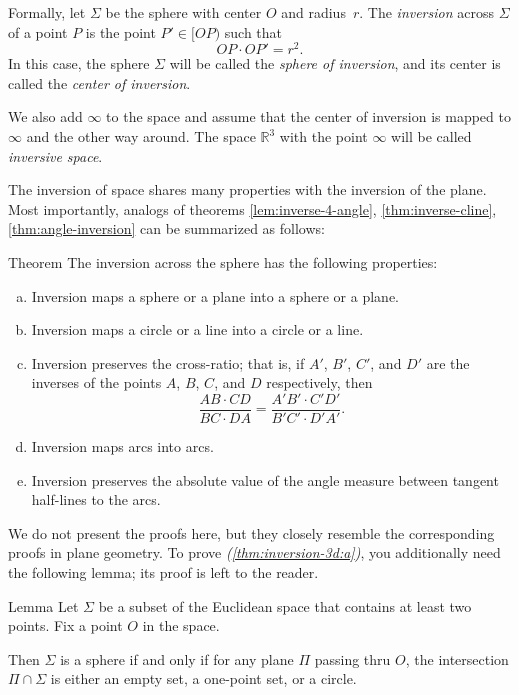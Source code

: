 Formally, let $\Sigma$ be the sphere with center $O$ and radius~$r$.
The \emph{inversion} across $\Sigma$ of a point $P$ is the point $P'\in[OP)$ such that
$$OP\cdot OP'=r^2.$$
In this case, the sphere $\Sigma$  will be called the 
\emph{sphere of inversion},
and its center is called the \emph{center of inversion}.

We also add $\infty$ to the space and assume that the center of inversion is mapped to $\infty$ and the other way around. 
The space $\mathbb{R}^3$ with the point $\infty$ will be called \emph{inversive space}.

The inversion of space shares many properties with the inversion of the plane.
Most importantly, analogs of theorems \ref{lem:inverse-4-angle}, \ref{thm:inverse-cline}, \ref{thm:angle-inversion} can be summarized as follows:

\begin{thm}{Theorem}\label{thm:inversion-3d}
The inversion across the sphere has the following properties:
\begin{enumerate}[(a)]
\item\label{thm:inversion-3d:a} Inversion maps a sphere or a plane into a sphere or a plane.
\item\label{thm:inversion-3d:b} Inversion maps a circle or a line into a circle or a line. 
\item\label{thm:inversion-3d:cross-ratio} Inversion preserves the cross-ratio;
that is, if $A'$, $B'$, $C'$, and $D'$ are the inverses of the points $A$, $B$, $C$, and $D$ respectively,
then
$$\frac{AB\cdot CD}{BC\cdot DA}= \frac{A'B'\cdot C'D'}{B'C'\cdot D'A'}.$$
\item Inversion maps arcs into arcs.
\item\label{thm:inversion-3d:angle} Inversion preserves the absolute value of the angle
measure between tangent half-lines to the arcs.
\end{enumerate}
\end{thm}


We do not present the proofs here, but they closely resemble the corresponding proofs in plane geometry.
To prove \textit{(\ref{thm:inversion-3d:a})}, you additionally need the following lemma;
its proof is left to the reader.

\begin{thm}{Lemma}
Let $\Sigma$ be a subset of the Euclidean space
that contains at least two points.
Fix a point $O$ in the space.

Then $\Sigma$ is 
a sphere 
if and only if
for any plane $\Pi$ passing thru $O$,
the intersection $\Pi\cap \Sigma$ is either an empty set,
a one-point set, or a circle.
\end{thm}  

